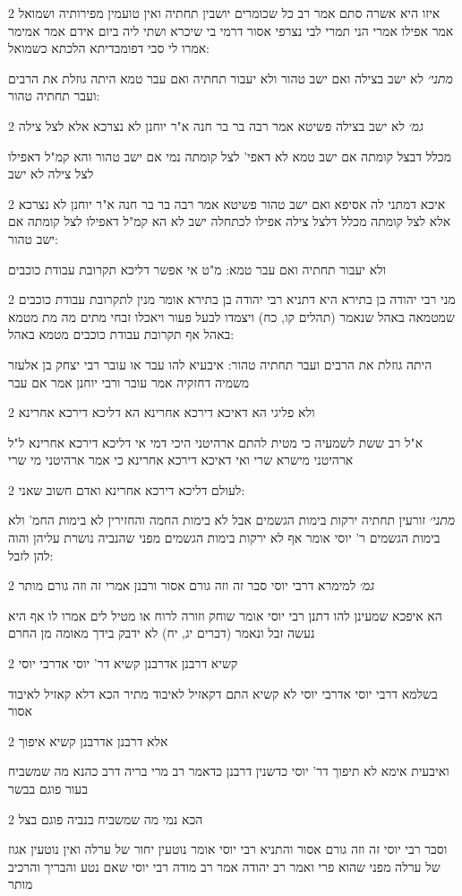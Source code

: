 \documentclass[12pt, openany]{book}
\newcommand{\sethebfont}{
\fontsize{10.5pt}{21.0pt} \selectfont
}
\newcommand{\twocol}[1]{
	{\sethebfont \begin{multicols}{2}
			#1
	\end{multicols}}	
}
\begin{document}
\twocol{איזו היא אשרה סתם אמר רב כל שכומרים יושבין תחתיה ואין טועמין מפירותיה ושמואל אמר אפילו אמרי הני תמרי לבי נצרפי אסור דרמי בי שיכרא ושתי ליה ביום אידם אמר אמימר אמרו לי סבי דפומבדיתא הלכתא כשמואל:
\par {\large\emph{מתני׳}} לא ישב בצילה ואם ישב טהור ולא יעבור תחתיה ואם עבר טמא היתה גוזלת את הרבים ועבר תחתיה טהור:}
\twocol{{\large\emph{גמ׳}} לא ישב בצילה פשיטא אמר רבה בר בר חנה א"ר יוחנן לא נצרכא אלא לצל צילה
\par מכלל דבצל קומתה אם ישב טמא לא דאפי' לצל קומתה נמי אם ישב טהור והא קמ"ל דאפילו לצל צילה לא ישב}
\twocol{איכא דמתני לה אסיפא ואם ישב טהור פשיטא אמר רבה בר בר חנה א"ר יוחנן לא נצרכא אלא לצל קומתה מכלל דלצל צילה אפילו לכתחלה ישב לא הא קמ"ל דאפילו לצל קומתה אם ישב טהור:
\par ולא יעבור תחתיה ואם עבר טמא: מ"ט אי אפשר דליכא תקרובת עבודת כוכבים}
\twocol{מני רבי יהודה בן בתירא היא דתניא רבי יהודה בן בתירא אומר מנין לתקרובת עבודת כוכבים שמטמאה באהל שנאמר (תהלים קו, כח) ויצמדו לבעל פעור ויאכלו זבחי מתים מה מת מטמא באהל אף תקרובת עבודת כוכבים מטמא באהל:
\par היתה גוזלת את הרבים ועבר תחתיה טהור: איבעיא להו עבר או עובר רבי יצחק בן אלעזר משמיה דחזקיה אמר עובר ורבי יוחנן אמר אם עבר}
\twocol{ולא פליגי הא דאיכא דירכא אחרינא הא דליכא דירכא אחרינא
\par א"ל רב ששת לשמעיה כי מטית להתם ארהיטני היכי דמי אי דליכא דירכא אחרינא ל"ל ארהיטני מישרא שרי ואי דאיכא דירכא אחרינא כי אמר ארהיטני מי שרי}
\twocol{לעולם דליכא דירכא אחרינא ואדם חשוב שאני:
\par {\large\emph{מתני׳}} זורעין תחתיה ירקות בימות הגשמים אבל לא בימות החמה והחזירין לא בימות החמ' ולא בימות הגשמים ר' יוסי אומר אף לא ירקות בימות הגשמים מפני שהנביה נושרת עליהן והוה להן לזבל:}
\twocol{{\large\emph{גמ׳}} למימרא דרבי יוסי סבר זה וזה גורם אסור ורבנן אמרי זה וזה גורם מותר
\par הא איפכא שמעינן להו דתנן רבי יוסי אומר שוחק וזורה לרוח או מטיל לים אמרו לו אף היא נעשה זבל ונאמר (דברים יג, יח) לא ידבק בידך מאומה מן החרם}
\twocol{קשיא דרבנן אדרבנן קשיא דר' יוסי אדרבי יוסי
\par בשלמא דרבי יוסי אדרבי יוסי לא קשיא התם דקאזיל לאיבוד מתיר הכא דלא קאזיל לאיבוד אסור}
\twocol{אלא דרבנן אדרבנן קשיא איפוך
\par ואיבעית אימא לא תיפוך דר' יוסי כדשנין דרבנן כדאמר רב מרי בריה דרב כהנא מה שמשביח בעור פוגם בבשר}
\twocol{הכא נמי מה שמשביח בנביה פוגם בצל
\par וסבר רבי יוסי זה וזה גורם אסור והתניא רבי יוסי אומר נוטעין יחור של ערלה ואין נוטעין אגוז של ערלה מפני שהוא פרי ואמר רב יהודה אמר רב מודה רבי יוסי שאם נטע והבריך והרכיב מותר}
\end{document}
